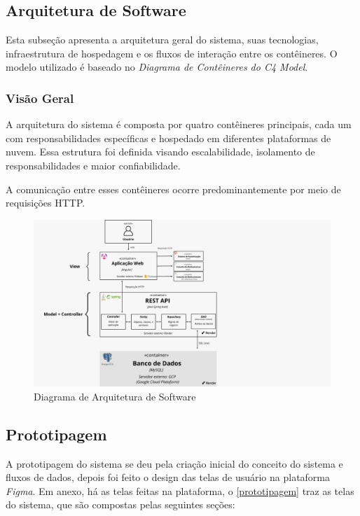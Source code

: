 \documentclass[
	article,			%
	12pt,				%
	oneside,			%
	a4paper,			%
    BIBLATEX,           %
	english,			%
	brazil,				%
	sumario=tradicional
	]{abntex2}
\begin{document}
\subsection{Arquitetura de Software}

Esta subseção apresenta a arquitetura geral do sistema, suas tecnologias, infraestrutura de hospedagem e os fluxos de interação entre os contêineres. O modelo utilizado é baseado no \textit{Diagrama de Contêineres do C4 Model}.

\subsubsection{Visão Geral}

A arquitetura do sistema é composta por quatro contêineres principais, cada um com responsabilidades específicas e hospedado em diferentes plataformas de nuvem. Essa estrutura foi definida visando escalabilidade, isolamento de responsabilidades e maior confiabilidade.

A comunicação entre esses contêineres ocorre predominantemente por meio de requisições HTTP.

\begin{figure}[h!]
    \centering
    \includegraphics[width=1\textwidth]{Figuras/diagrama_de_software.jpeg}
    \caption{Diagrama de Arquitetura de Software}
    \label{fig:diagrama_software}
\end{figure}

\newpage

\subsection{Prototipagem}

A prototipagem do sistema se deu pela criação inicial do conceito do sistema e fluxos de dados, depois foi feito o design das telas de usuário na plataforma \textit{Figma}. Em anexo, há as telas feitas na plataforma, o \autoref{prototipagem} traz as telas do sistema, que são compostas pelas seguintes seções:
\end{document}
